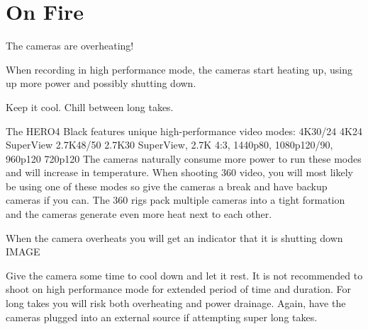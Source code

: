 \chapter{On Fire}
\pagecolor{white}
\label{chap:19}
\begin{fullwidth}


\problem

{\large The cameras are overheating!


 \par}

When recording in high performance mode, the cameras start heating up, using up more power and possibly shutting down. 


\solution

{\large Keep it cool. Chill between long takes. 


 \par}

The HERO4 Black features unique high-performance video modes: 
4K30/24 4K24 SuperView
2.7K48/50 2.7K30 SuperView, 2.7K 4:3, 
1440p80, 
1080p120/90, 
960p120 
720p120
The cameras naturally consume more power to run these modes and will increase in temperature. When shooting 360 video, you will most likely be using one of these modes so give the cameras a break and have backup cameras if you can. The 360 rigs pack multiple cameras into a tight formation and the cameras generate even more heat next to each other. 

When the camera overheats you will get an indicator that it is shutting down
	      IMAGE
                 
Give the camera some time to cool down and let it rest. It is not recommended to shoot on high performance mode for extended period of time and duration. For long takes you will risk both overheating and power drainage. Again, have the cameras plugged into an external source if attempting super long takes. 






\clearpage
\end{fullwidth}
